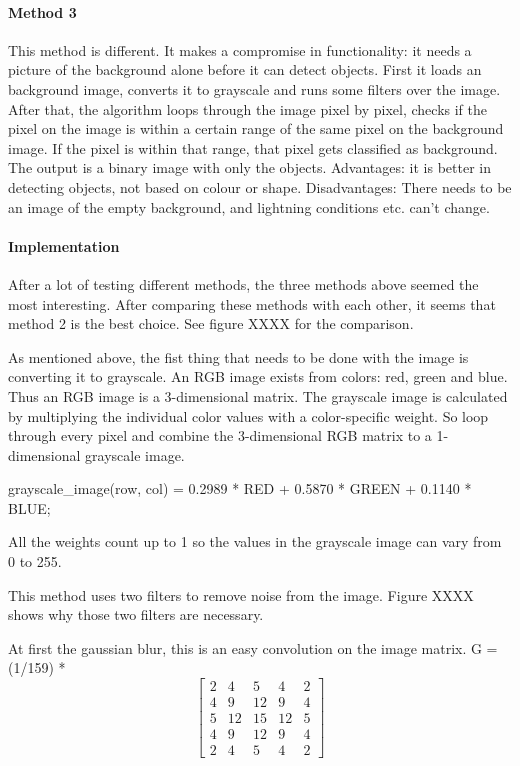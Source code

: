 \documentclass{article}
\begin{document}
\paragraph{Method 3}
This method is different. It makes a compromise in functionality: it needs a picture of the background alone before it can detect objects. First it loads an background image, converts it to grayscale and runs some filters over the image. After that, the algorithm loops through the image pixel by pixel, checks if the pixel on the image is within a certain range of the same pixel on the background image. If the pixel is within that range, that pixel gets classified as background. The output is a binary image with only the objects.  
Advantages: it is better in detecting objects, not based on colour or shape.
Disadvantages: There needs to be an image of the empty background, and lightning conditions etc. can’t change.

\paragraph{Implementation}
After a lot of testing different methods, the three methods above seemed the most interesting. After comparing these methods with each other, it seems that method 2 is the best choice. See figure XXXX for the comparison.

As mentioned above, the fist thing that needs to be done with the image is converting it to grayscale. An RGB image exists from colors: red, green and blue. Thus an RGB image is a 3-dimensional matrix. The grayscale image is calculated by multiplying the individual color values with a color-specific weight. So loop through every pixel and combine the 3-dimensional RGB matrix to a 1-dimensional grayscale image.

grayscale_image(row, col) = 0.2989 * RED + 0.5870 * GREEN + 0.1140 * BLUE;  

All the weights count up to 1 so the values in the grayscale image can vary from 0 to 255.

This method uses two filters to remove noise from the image. 
Figure XXXX shows why those two filters are necessary.

At first the gaussian blur, this is an easy convolution on the image matrix.
G = (1/159) * \[
\begin{bmatrix}
    2 & 4 & 5 & 4 & 2\\
    4 & 9 & 12 & 9 &4\\
    5 & 12 &15&12&5\\
    4&9&12&9&4\\
    2&4&5&4&2
\end{bmatrix}
\]
\end{document}
